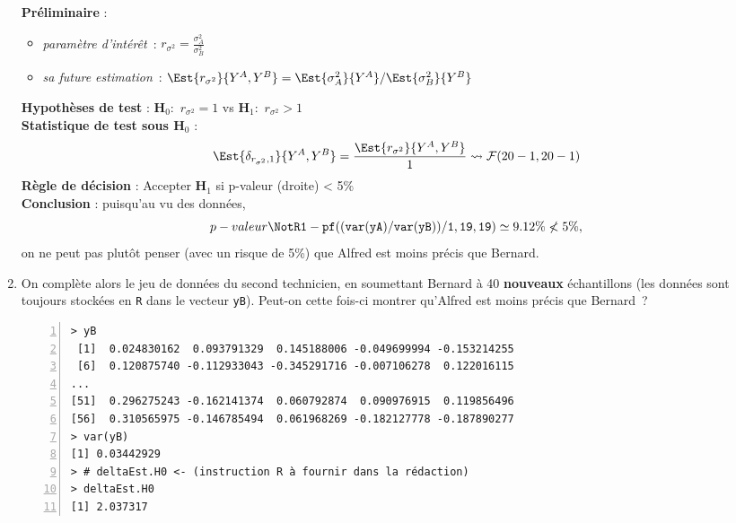 \documentclass[10pt]{report}
\begin{document}
\begin{exercice}
\begin{enumerate}
\begin{Correction}
\noindent \textbf{Préliminaire} : \begin{itemize}
\item \textit{paramètre d'intérêt}~: $r_{\sigma^2}=\displaystyle \frac{\sigma^2_{A}}{\sigma^2_{B}}$
\item \textit{sa future estimation}~: $\Est{r_{\sigma^2}}{Y^{A},Y^{B}}=\Est{\sigma^2_{A}}{Y^{A}}/\Est{\sigma^2_{B}}{Y^{B}}$
\end{itemize}
\noindent \textbf{Hypothèses de test} : $\mathbf{H}_0:$ $r_{\sigma^2}=1$ vs {\large $\mathbf{H}_1:$ $r_{\sigma^2}>1$}\\
\textbf{Statistique de test sous $\mathbf{H}_0$} :
  $$
  \Est{\delta_{r_{\sigma^2},1}}{Y^{A},Y^{B}}= {\displaystyle \frac{\Est{r_{\sigma^2}}{Y^{A},Y^{B}}}{1}} 
  \leadsto \mathcal{F}(20-1,20-1) 
  $$
\textbf{Règle de décision} : Accepter $\mathbf{H}_1$ si 
  p-valeur (droite) < 5\%\\
\noindent \textbf{Conclusion} :
puisqu'au vu des données, 
  \[
p-valeur\NotR\mathtt{1-pf((var(yA)/var(yB))/1,19,19)} \simeq 9.12\%\nless5\%,
\]
on ne peut pas plutôt penser (avec un risque de 5\%) que Alfred est moins précis que Bernard.
\end{Correction}


\item On complète alors le jeu de données du second technicien, en soumettant Bernard à 40 \textbf{nouveaux} échantillons (les données sont toujours stockées en \texttt{R} dans le vecteur \texttt{yB}). Peut-on cette fois-ci montrer qu'Alfred est moins précis que Bernard~?

\IndicR
\begin{Verbatim}[frame=leftline,fontfamily=tt,fontshape=n,numbers=left]
> yB
 [1]  0.024830162  0.093791329  0.145188006 -0.049699994 -0.153214255
 [6]  0.120875740 -0.112933043 -0.345291716 -0.007106278  0.122016115
...
[51]  0.296275243 -0.162141374  0.060792874  0.090976915  0.119856496
[56]  0.310565975 -0.146785494  0.061968269 -0.182127778 -0.187890277
> var(yB)
[1] 0.03442929
> # deltaEst.H0 <- (instruction R à fournir dans la rédaction)
> deltaEst.H0
[1] 2.037317
\end{Verbatim}




\end{enumerate}
\end{exercice}
\end{document}
